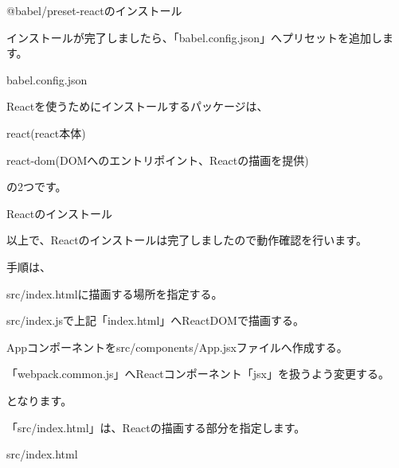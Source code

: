 \def\startercodeblockfontsize{}
\begin{starterterminal}[]{@babel/preset{-}reactのインストール}\end{starterterminal}

インストールが完了しましたら、「babel.config.json」へプリセットを追加します。

\def\startercodeblockfontsize{}
\begin{starterprogram}[]{babel.config.json}\end{starterprogram}
\vspace*{\baselineskip}

Reactを使うためにインストールするパッケージは、

\begin{starteritemize}
\item react(react本体)
\item react{-}dom(DOMへのエントリポイント、Reactの描画を提供)
\end{starteritemize}

の2つです。

\def\startercodeblockfontsize{}
\begin{starterterminal}[]{Reactのインストール}\end{starterterminal}

以上で、Reactのインストールは完了しましたので動作確認を行います。

\vspace*{\baselineskip}

手順は、

\begin{starterenumerate}
\item src/index.htmlに描画する場所を指定する。
\item src/index.jsで上記「index.html」へReactDOMで描画する。
\item Appコンポーネントをsrc/components/App.jsxファイルへ作成する。
\item 「webpack.common.js」へReactコンポーネント「jsx」を扱うよう変更する。
\end{starterenumerate}

となります。

「src/index.html」は、Reactの描画する部分を指定します。

\def\startercodeblockfontsize{}
\begin{starterprogram}[]{src/index.html}\end{starterprogram}

